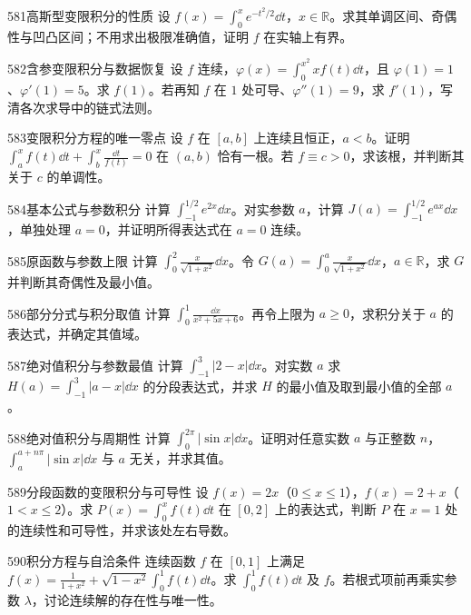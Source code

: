 \begin{exercise}{581}{高斯型变限积分的性质}
设 $f(x)=\int_0^xe^{-t^2/2}\dd t$，$x\in\mathbb R$。求其单调区间、奇偶性与凹凸区间；不用求出极限准确值，证明 $f$ 在实轴上有界。
\end{exercise}
\begin{exercise}{582}{含参变限积分与数据恢复}
设 $f$ 连续，$\varphi(x)=\int_0^{x^2}xf(t)\dd t$，且 $\varphi(1)=1$、$\varphi'(1)=5$。求 $f(1)$。若再知 $f$ 在 $1$ 处可导、$\varphi''(1)=9$，求 $f'(1)$，写清各次求导中的链式法则。
\end{exercise}
\begin{exercise}{583}{变限积分方程的唯一零点}
设 $f$ 在 $[a,b]$ 上连续且恒正，$a<b$。证明 $\int_a^xf(t)\dd t+\int_b^x\frac{\dd t}{f(t)}=0$ 在 $(a,b)$ 恰有一根。若 $f\equiv c>0$，求该根，并判断其关于 $c$ 的单调性。
\end{exercise}
\begin{exercise}{584}{基本公式与参数积分}
计算 $\int_{-1}^{1/2}e^{2x}\dd x$。对实参数 $a$，计算 $J(a)=\int_{-1}^{1/2}e^{ax}\dd x$，单独处理 $a=0$，并证明所得表达式在 $a=0$ 连续。
\end{exercise}
\begin{exercise}{585}{原函数与参数上限}
计算 $\int_0^2\frac{x}{\sqrt{1+x^2}}\dd x$。令 $G(a)=\int_0^a\frac{x}{\sqrt{1+x^2}}\dd x$，$a\in\mathbb R$，求 $G$ 并判断其奇偶性及最小值。
\end{exercise}
\begin{exercise}{586}{部分分式与积分取值}
计算 $\int_0^1\frac{\dd x}{x^2+5x+6}$。再令上限为 $a\ge0$，求积分关于 $a$ 的表达式，并确定其值域。
\end{exercise}
\begin{exercise}{587}{绝对值积分与参数最值}
计算 $\int_{-1}^3|2-x|\dd x$。对实数 $a$ 求 $H(a)=\int_{-1}^3|a-x|\dd x$ 的分段表达式，并求 $H$ 的最小值及取到最小值的全部 $a$。
\end{exercise}
\begin{exercise}{588}{绝对值积分与周期性}
计算 $\int_0^{2\pi}|\sin x|\dd x$。证明对任意实数 $a$ 与正整数 $n$，$\int_a^{a+n\pi}|\sin x|\dd x$ 与 $a$ 无关，并求其值。
\end{exercise}
\begin{exercise}{589}{分段函数的变限积分与可导性}
设 $f(x)=2x$（$0\le x\le1$），$f(x)=2+x$（$1<x\le2$）。求 $P(x)=\int_0^xf(t)\dd t$ 在 $[0,2]$ 上的表达式，判断 $P$ 在 $x=1$ 处的连续性和可导性，并求该处左右导数。
\end{exercise}
\begin{exercise}{590}{积分方程与自洽条件}
连续函数 $f$ 在 $[0,1]$ 上满足 $f(x)=\frac1{1+x^2}+\sqrt{1-x^2}\int_0^1f(t)\dd t$。求 $\int_0^1f(t)\dd t$ 及 $f$。若根式项前再乘实参数 $\lambda$，讨论连续解的存在性与唯一性。
\end{exercise}
